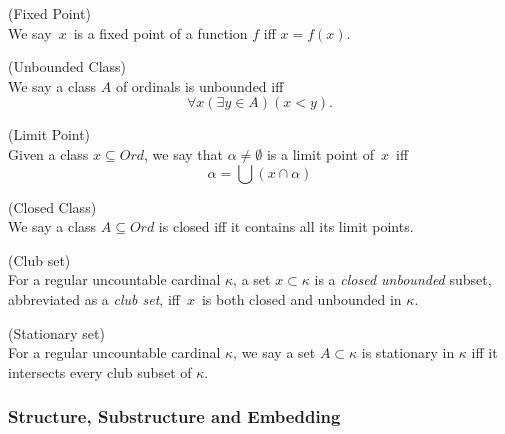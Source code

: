\begin{definition}{(Fixed Point)}\label{def:fixed_point}\\
We say~$x$~is a fixed point of a function $f$ iff $x=f(x)$.
\end{definition}

\begin{definition}{(Unbounded Class)}\label{def:unbounded_class}\\
We say a class $A$ of ordinals is unbounded iff
\begin{equation}
\forall x (\exists y \in A) (x < y)\mbox{.}
\end{equation}
\end{definition}

\begin{definition}{(Limit Point)}\label{def:limit_point}\\
Given a class $x \subseteq Ord$, we say that $\alpha \neq \emptyset$ is a limit point of~$x$~iff 
\begin{equation}
\alpha = \bigcup(x \cap \alpha)
\end{equation}
\end{definition}

\begin{definition}{(Closed Class)}\label{def:closed_class}\\
We say a class $A \subseteq Ord$ is closed iff it contains all its limit points.
\end{definition}

\begin{definition}{(Club set)}\label{def:club_set}\\
For a regular uncountable cardinal $\kappa$, a set $x \subset \kappa$ is a \emph{closed unbounded} subset, abbreviated as a \emph{club set}, iff~$x$~is both closed and unbounded in $\kappa$.
\end{definition}

\begin{definition}{(Stationary set)}\label{def:stationary_set}\\
For a regular uncountable cardinal $\kappa$, we say a set $A \subset \kappa$ is stationary in $\kappa$ iff it intersects every club subset of $\kappa$.
\end{definition}

\subsubsection{Structure, Substructure and Embedding}

